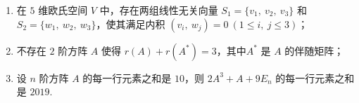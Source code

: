 \begin{enumerate}
\begin{enumerate}[label=(\arabic*)]
        \item 在 $5$ 维欧氏空间 $V$ 中，存在两组线性无关向量 $S_1=\{v_1,\ v_2,\ v_3\}$ 和 $S_2=\{w_1,\ w_2,\ w_3\}$，使其满足内积 $(v_i,\ w_j)=0\ (1 \leq i,\ j \leq 3)$；
        \item 不存在 $2$ 阶方阵 $A$ 使得 $r(A)+r(A^*)=3$，其中$A^*$ 是 $A$ 的伴随矩阵；
        \item 设 $n$ 阶方阵 $A$ 的每一行元素之和是 $10$，则 $2A^3+A+9E_n$ 的每一行元素之和是 $2019$.
    \end{enumerate}
\end{enumerate}

\clearpage
